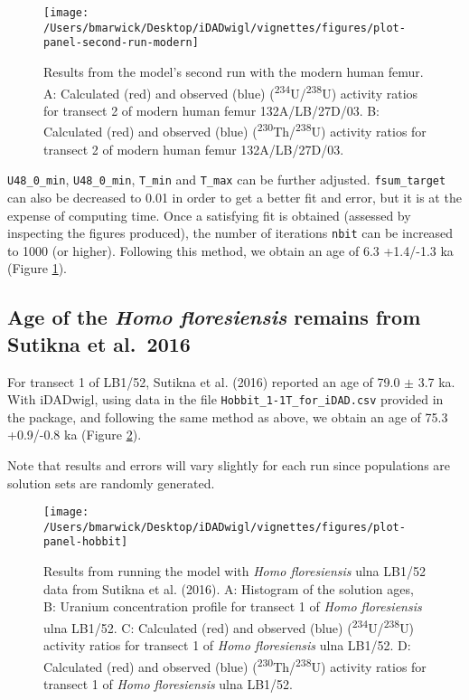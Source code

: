 \documentclass[]{elsarticle} %
\begin{document}
\begin{figure}
\texttt{[image: /Users/bmarwick/Desktop/iDADwigl/vignettes/figures/plot-panel-second-run-modern]} \caption{Results from the model's second run with the modern human femur. A: Calculated (red) and observed (blue) (\textsuperscript{234}U/\textsuperscript{238}U) activity ratios for transect 2 of modern human femur 132A/LB/27D/03. B: Calculated (red) and observed (blue) (\textsuperscript{230}Th/\textsuperscript{238}U) activity ratios for transect 2 of modern human femur 132A/LB/27D/03.}\label{fig:plot-panel-second-run-modern-fig}
\end{figure}

\FloatBarrier

\texttt{U48\_0\_min}, \texttt{U48\_0\_min}, \texttt{T\_min} and \texttt{T\_max} can be further adjusted. \texttt{fsum\_target} can also be decreased to 0.01 in order to get a better fit and error, but it is at the expense of computing time. Once a satisfying fit is obtained (assessed by inspecting the figures produced), the number of iterations \texttt{nbit} can be increased to 1000 (or higher). Following this method, we obtain an age of 6.3 +1.4/-1.3 ka (Figure \ref{fig:plot-panel-second-run-modern-fig}).

\hypertarget{age-of-the-homo-floresiensis-remains-from-sutikna-et-al.2016}{%
\subsection{\texorpdfstring{Age of the \emph{Homo floresiensis} remains from Sutikna et al.~2016}{Age of the Homo floresiensis remains from Sutikna et al.~2016}}\label{age-of-the-homo-floresiensis-remains-from-sutikna-et-al.2016}}

For transect 1 of LB1/52, Sutikna et al. (2016) reported an age of 79.0 \(\pm\) 3.7 ka. With iDADwigl, using data in the file \texttt{Hobbit\_1-1T\_for\_iDAD.csv} provided in the package, and following the same method as above, we obtain an age of 75.3 +0.9/-0.8 ka (Figure \ref{fig:plot-panel-hobbit-fig}).

Note that results and errors will vary slightly for each run since populations are solution sets are randomly generated.

\newpage



\begin{figure}
\texttt{[image: /Users/bmarwick/Desktop/iDADwigl/vignettes/figures/plot-panel-hobbit]} \caption{Results from running the model with \emph{Homo floresiensis} ulna LB1/52 data from Sutikna et al. (2016). A: Histogram of the solution ages, B: Uranium concentration profile for transect 1 of \emph{Homo floresiensis} ulna LB1/52. C: Calculated (red) and observed (blue) (\textsuperscript{234}U/\textsuperscript{238}U) activity ratios for transect 1 of \emph{Homo floresiensis} ulna LB1/52. D: Calculated (red) and observed (blue) (\textsuperscript{230}Th/\textsuperscript{238}U) activity ratios for transect 1 of \emph{Homo floresiensis} ulna LB1/52.}\label{fig:plot-panel-hobbit-fig}
\end{figure}
\end{document}
